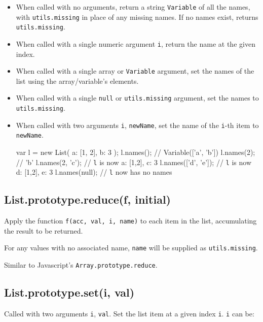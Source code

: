 \documentclass{article}
\begin{document}
\begin{itemize}

\item When called with no arguments, return a string \texttt{Variable} of all the names,
with \texttt{utils.missing} in place of any missing names. If no names exist,
returns \texttt{utils.missing}.

\item When called with a single numeric argument \texttt{i}, return the name at the
given index.

\item When called with a single array or \texttt{Variable} argument, set the names of the
list using the array/variable's elements.

\item When called with a single \texttt{null} or \texttt{utils.missing} argument, set the names
to \texttt{utils.missing}.

\item When called with two arguments \texttt{i}, \texttt{newName}, set the name of the \texttt{i}-th item
to \texttt{newName}.


  var l = new List({ a: [1, 2], b: 3 });
  l.names();           // Variable(['a', 'b'])
  l.names(2);          // 'b'
  l.names(2, 'c');     // \texttt{l} is now { a: [1,2], c: 3 }
  l.names(['d', 'e']); // \texttt{l} is now { d: [1,2], e: 3 }
  l.names(null);       // \texttt{l} now has no names




\end{itemize}

    \subsection*{List.prototype.reduce(f, initial)}
    Apply the function \texttt{f(acc, val, i, name)} to each item in the list,
accumulating the result to be returned.


For any values with no associated name, \texttt{name} will be supplied as
\texttt{utils.missing}.


Similar to Javascript's \texttt{Array.prototype.reduce}.


    \subsection*{List.prototype.set(i, val)}
    Called with two arguments \texttt{i}, \texttt{val}. Set the list item at a given index \texttt{i}.
\texttt{i} can be:
\end{document}
